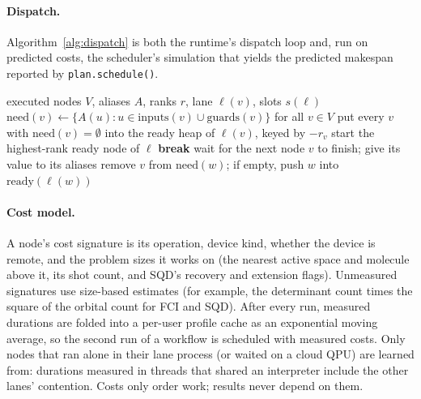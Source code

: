 \documentclass[10pt]{article}
\newcommand{\code}[1]{\texttt{#1}}
\begin{document}
\paragraph{Dispatch.} Algorithm~\ref{alg:dispatch} is both the runtime's dispatch loop
and, run on predicted costs, the scheduler's simulation that yields the predicted
makespan reported by \code{plan.schedule()}.

\begin{algorithm}[t]
\caption{Lane dispatch (runtime and predicted-makespan simulation)}
\label{alg:dispatch}
\begin{algorithmic}[1]
\Require executed nodes $V$, aliases $A$, ranks $r$, lane $\ell(v)$, slots $s(\ell)$
\State $\mathrm{need}(v) \gets \{A(u) : u \in \mathrm{inputs}(v) \cup \mathrm{guards}(v)\}$ for all $v \in V$
\State put every $v$ with $\mathrm{need}(v)=\emptyset$ into the ready heap of $\ell(v)$, keyed by $-r_v$
\Loop
      \State start the highest-rank ready node of $\ell$ 
    \EndWhile
  \EndFor
   \textbf{break} \EndIf
  \State wait for the next node $v$ to finish; give its value to its aliases
    \State remove $v$ from $\mathrm{need}(w)$; if empty, push $w$ into $\mathrm{ready}(\ell(w))$
  \EndFor
\EndLoop
\end{algorithmic}
\end{algorithm}

\paragraph{Cost model.} A node's cost signature is its operation, device kind, whether
the device is remote, and the problem sizes it works on (the nearest active space and
molecule above it, its shot count, and SQD's recovery and extension flags). Unmeasured
signatures use size-based estimates (for example, the determinant count times the
square of the orbital count for FCI and SQD). After every run, measured durations are
folded into a per-user profile cache as an exponential moving average, so the second run
of a workflow is scheduled with measured costs. Only nodes that ran alone in their lane
process (or waited on a cloud QPU) are learned from: durations measured in threads that
shared an interpreter include the other lanes' contention. Costs only order work;
results never depend on them.
\end{document}
